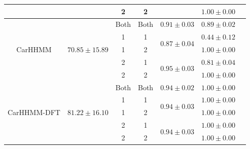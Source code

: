 \begin{table}
{\begin{tabular}{ccccccc}
                           &                                    & 2                             & 2                                &                                   & $1.00 \pm 0.00$                       \\ \hline
\multirow{5}{*}{CarHHMM}   & \multirow{5}{*}{$70.85 \pm 15.89$}   & Both                          & Both                             & $0.91 \pm 0.03$                   & $0.89 \pm 0.02$                       \\
                           &                                    & 1                             & 1                                & \multirow{2}{*}{$0.87\pm0.04$}    & $0.44 \pm 0.12$                       \\ 
                           &                                    & 1                             & 2                                &                                   & $1.00 \pm 0.00$                       \\ 
                           &                                    & 2                             & 1                                & \multirow{2}{*}{$0.95\pm0.03$}    & $0.81 \pm 0.04$                       \\ 
                           &                                    & 2                             & 2                                &                                   & $1.00 \pm 0.00$                       \\ \hline
\multirow{5}{*}{CarHHMM-DFT}& \multirow{5}{*}{$81.22 \pm 16.10$}   & Both                          & Both                             & $0.94 \pm 0.02$                   & $1.00 \pm 0.00$                       \\
                           &                                    & 1                             & 1                                & \multirow{2}{*}{$0.94\pm0.03$}    & $1.00 \pm 0.00$                       \\ 
                           &                                    & 1                             & 2                                &                                   & $1.00 \pm 0.00$                       \\ 
                           &                                    & 2                             & 1                                & \multirow{2}{*}{$0.94\pm0.03$}    & $1.00 \pm 0.00$                       \\ 
                           &                                    & 2                             & 2                                &                                   & $1.00 \pm 0.00$                       \\ \hline
\end{tabular}
}
\label{table:accuracy}
\end{table}

